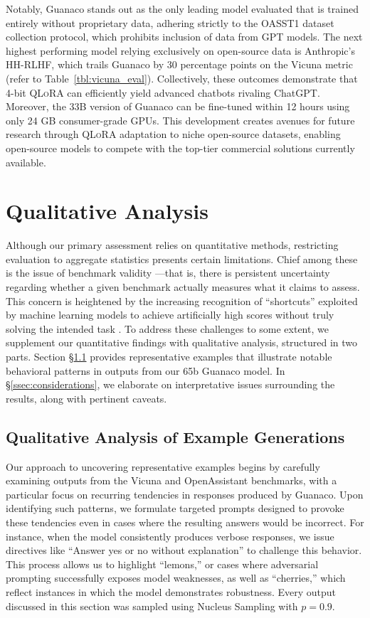 Notably, {Guanaco} stands out as the only leading model evaluated that is trained entirely without proprietary data, adhering strictly to the OASST1 dataset collection protocol, which prohibits inclusion of data from GPT models. The next highest performing model relying exclusively on open-source data is Anthropic’s HH-RLHF, which trails {Guanaco} by 30 percentage points on the Vicuna metric (refer to Table~\ref{tbl:vicuna_eval}). Collectively, these outcomes demonstrate that 4-bit \textsc{QLoRA} can efficiently yield advanced chatbots rivaling ChatGPT. Moreover, the 33B version of {Guanaco} can be fine-tuned within 12 hours using only 24 GB consumer-grade GPUs. This development creates avenues for future research through \textsc{QLoRA} adaptation to niche open-source datasets, enabling open-source models to compete with the top-tier commercial solutions currently available.

\section{Qualitative Analysis}

Although our primary assessment relies on quantitative methods, restricting evaluation to aggregate statistics presents certain limitations. Chief among these is the issue of benchmark validity \citep{liao2021we}—that is, there is persistent uncertainty regarding whether a given benchmark actually measures what it claims to assess. This concern is heightened by the increasing recognition of ``shortcuts'' exploited by machine learning models to achieve artificially high scores without truly solving the intended task \citep{gururangan2018annotation, poliak2018hypothesis}. To address these challenges to some extent, we supplement our quantitative findings with qualitative analysis, structured in two parts. Section \S\ref{ssec:examples} provides representative examples that illustrate notable behavioral patterns in outputs from our 65b {Guanaco} model. In \S\ref{ssec:considerations}, we elaborate on interpretative issues surrounding the results, along with pertinent caveats.

\subsection{Qualitative Analysis of Example Generations}
\label{ssec:examples}

Our approach to uncovering representative examples begins by carefully examining outputs from the Vicuna and OpenAssistant benchmarks, with a particular focus on recurring tendencies in responses produced by {Guanaco}. Upon identifying such patterns, we formulate targeted prompts designed to provoke these tendencies even in cases where the resulting answers would be incorrect. For instance, when the model consistently produces verbose responses, we issue directives like ``Answer yes or no without explanation'' to challenge this behavior. This process allows us to highlight ``lemons,'' or cases where adversarial prompting successfully exposes model weaknesses, as well as ``cherries,'' which reflect instances in which the model demonstrates robustness. Every output discussed in this section was sampled using Nucleus Sampling \cite{holtzmancurious} with $p=0.9$.

